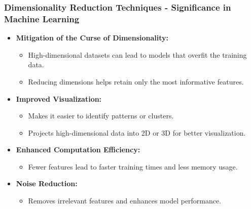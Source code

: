 \documentclass[aspectratio=169]{beamer}
\begin{document}
\begin{frame}[fragile]
    \frametitle{Dimensionality Reduction Techniques - Significance in Machine Learning}
    \begin{itemize}
        \item \textbf{Mitigation of the Curse of Dimensionality:}
        \begin{itemize}
            \item High-dimensional datasets can lead to models that overfit the training data.
            \item Reducing dimensions helps retain only the most informative features.
        \end{itemize}
        
        \item \textbf{Improved Visualization:}
        \begin{itemize}
            \item Makes it easier to identify patterns or clusters.
            \item Projects high-dimensional data into 2D or 3D for better visualization.
        \end{itemize}
        
        \item \textbf{Enhanced Computation Efficiency:}
        \begin{itemize}
            \item Fewer features lead to faster training times and less memory usage.
        \end{itemize}
        
        \item \textbf{Noise Reduction:}
        \begin{itemize}
            \item Removes irrelevant features and enhances model performance.
        \end{itemize}
    \end{itemize}
\end{frame}
\end{document}
